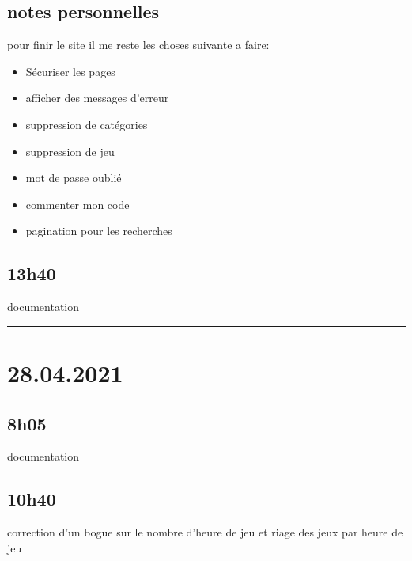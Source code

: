 \documentclass[a4paper,12pt,french]{sphinxmanual}
\begin{document}
\subsection{notes personnelles}
\label{\detokenize{logbook:id40}}
\sphinxAtStartPar
pour finir le site il me reste les choses suivante a faire:
\begin{itemize}
\item {} 
\sphinxAtStartPar
Sécuriser les pages

\item {} 
\sphinxAtStartPar
afficher des messages d’erreur

\item {} 
\sphinxAtStartPar
suppression de catégories

\item {} 
\sphinxAtStartPar
suppression de jeu

\item {} 
\sphinxAtStartPar
mot de passe oublié

\item {} 
\sphinxAtStartPar
commenter mon code

\item {} 
\sphinxAtStartPar
pagination pour les recherches

\end{itemize}


\subsection{13h40}
\label{\detokenize{logbook:id41}}
\sphinxAtStartPar
documentation


\bigskip\hrule\bigskip



\section{28.04.2021}
\label{\detokenize{logbook:id42}}

\subsection{8h05}
\label{\detokenize{logbook:id43}}
\sphinxAtStartPar
documentation


\subsection{10h40}
\label{\detokenize{logbook:id44}}
\sphinxAtStartPar
correction d’un bogue sur le nombre d’heure de jeu et riage des jeux par heure de jeu
\end{document}
